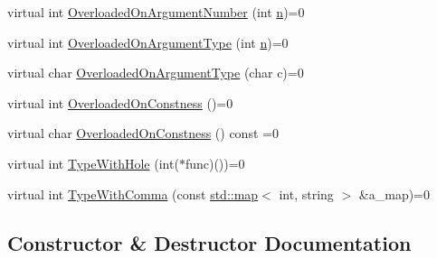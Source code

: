 \begin{DoxyCompactItemize}
\item 
virtual int \hyperlink{classtesting_1_1gmock__generated__function__mockers__test_1_1FooInterface_a1b5ff8cc745af475e0abba5d2858e1c9}{Overloaded\+On\+Argument\+Number} (int \hyperlink{app_2main_8cpp_acfc02ec89670db29251fda6a66602ce2}{n})=0
\item 
virtual int \hyperlink{classtesting_1_1gmock__generated__function__mockers__test_1_1FooInterface_ad9cc9a11570403fb8378ed6620892ec6}{Overloaded\+On\+Argument\+Type} (int \hyperlink{app_2main_8cpp_acfc02ec89670db29251fda6a66602ce2}{n})=0
\item 
virtual char \hyperlink{classtesting_1_1gmock__generated__function__mockers__test_1_1FooInterface_a8cb6caa44216ba29fc228b016523abe9}{Overloaded\+On\+Argument\+Type} (char c)=0
\item 
virtual int \hyperlink{classtesting_1_1gmock__generated__function__mockers__test_1_1FooInterface_afbbe6ec72ae237de05e109dea5b03f4f}{Overloaded\+On\+Constness} ()=0
\item 
virtual char \hyperlink{classtesting_1_1gmock__generated__function__mockers__test_1_1FooInterface_ab40007385078cdb675616a21ef254df4}{Overloaded\+On\+Constness} () const =0
\item 
virtual int \hyperlink{classtesting_1_1gmock__generated__function__mockers__test_1_1FooInterface_a9e92ef227dc68806f85ebff9c8a6102a}{Type\+With\+Hole} (int($\ast$func)())=0
\item 
virtual int \hyperlink{classtesting_1_1gmock__generated__function__mockers__test_1_1FooInterface_a654ade1e68b5adb922149898bfe4ccda}{Type\+With\+Comma} (const \hyperlink{app_2main_8cpp_a8f2b5a2f358cff079fbf01614064fbe5}{std\+::map}$<$ int, string $>$ \&a\+\_\+map)=0
\end{DoxyCompactItemize}


\subsection{Constructor \& Destructor Documentation}

